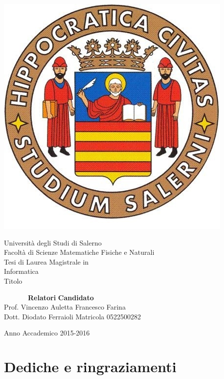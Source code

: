 \documentclass[11pt,oneside]{book}
\theoremstyle{plain}
\begin{document}

\begin{titlepage}
\begin{center}
\begin{center}
\includegraphics[scale=0.28, natwidth=793, natheight=1123]{img/logounisa.jpg}
\end{center}
{\Large Universit\`a degli Studi di Salerno}\\[0.2truecm]
{\large Facolt\`a di Scienze Matematiche Fisiche e Naturali}\\
\hrulefill
\vfill
{\large Tesi di Laurea Magistrale in}\\[0.2truecm]
{\Large Informatica}\\
\vfill\vfill
{\Huge Titolo}
\vfill\vfill


\ \ \ \ \ \ \ {\bf Relatori} \hfill {\bf Candidato}\ \ \\
Prof. Vincenzo Auletta \hfill Francesco Farina\\
Dott. Diodato Ferraioli \hfill Matricola 0522500282

\vfill
\hrulefill 

Anno Accademico 2015-2016

\end{center}
\end{titlepage}


\chapter*{Dediche e ringraziamenti}
\vfill
\end{document}
